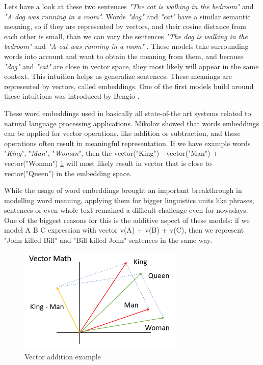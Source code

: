Lets have a look at these two sentences \textit{"The cat is walking in the bedroom"} and \textit{"A dog was running in a room"}. Words \textit{"dog"} and \textit{"cat"} have a similar semantic meaning, so if they are represented by vectors, and their cosine distance from each other is small, than we can vary the sentences \textit{"The dog is walking in the bedroom"} and \textit{"A cat was running in a room"} \cite{Bengio:2003}. These models take surrounding words into account and want to obtain the meaning from them\cite{Jurafsky:2018}, and because \textit{"dog"} and \textit{"cat"} are close in vector space, they most likely will appear in the same context. This intuition helps us generalize sentences. These meanings are represented by vectors, called embeddings. One of the first models build around these intuitions was introduced by Bengio \cite{Bengio:2003}. 

These word embeddings used in basically all state-of-the art systems related to natural language processing applications. Mikolov \cite{Mikolov:2013c} showed that words embeddings can be applied for vector operations, like addition or subtraction, and these operations often result in meaningful representation. If we have example words "\textit{King}", "\textit{Man}", "\textit{Woman}", then the vector("King") - vector("Man") + vector("Woman") \ref{fig:vecs} will most likely result in vector that is close to vector("Queen") in the embedding space.

 While the usage of word embeddings brought an important breakthrough in modelling word meaning, applying them for bigger linguistics units like phrases, sentences or even whole text remained a difficult challenge even for nowadays. One of the biggest reasons for this is the additive aspect of these models: if we model A B C expression with vector v(A) + v(B) + v(C), then we represent "John killed Bill" and "Bill killed John" sentences in the same way. 

\begin{figure}[h!]
	\centering
	\includegraphics[width=0.7\textwidth]{figures/vecs}
	\caption{Vector addition example}
	\label{fig:vecs}
\end{figure}

